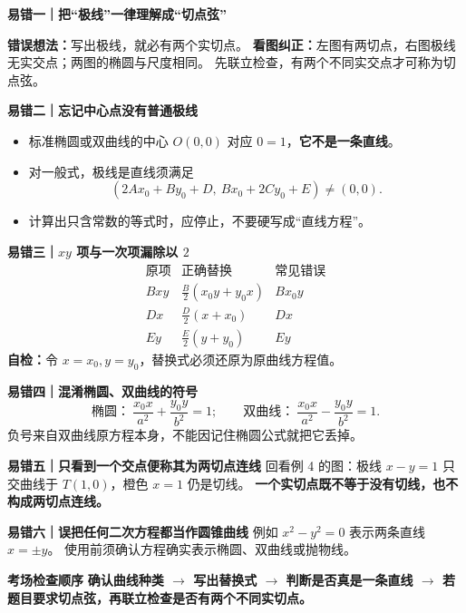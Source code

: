 \begin{trapbox}
\begin{minipage}{\linewidth}
\textbf{\textcolor{CTrap}{易错一｜把“极线”一律理解成“切点弦”}}

\begin{center}

\end{center}

\textbf{错误想法：}写出极线，就必有两个实切点。
\textbf{看图纠正：}左图有两切点，右图极线无实交点；两图的椭圆与尺度相同。
先联立检查，有两个不同实交点才可称为切点弦。
\end{minipage}
\par


\medskip
\textbf{\textcolor{CTrap}{易错二｜忘记中心点没有普通极线}}
\begin{itemize}[leftmargin=*,itemsep=0.35em]
 \item 标准椭圆或双曲线的中心 $O(0,0)$ 对应 $0=1$，\textbf{它不是一条直线}。
 \item 对一般式，极线是直线须满足
 \[
 (2Ax_0+By_0+D,\ Bx_0+2Cy_0+E)\ne(0,0).
 \]
 \item 计算出只含常数的等式时，应停止，不要硬写成“直线方程”。
\end{itemize}

\medskip
\textbf{\textcolor{CTrap}{易错三｜$xy$ 项与一次项漏除以 $2$}}
\[
 \begin{array}{c|c|c}
 \text{原项}&\text{正确替换}&\text{常见错误}\\
 Bxy &\frac B2(x_0y+y_0x)&Bx_0y\\
 Dx &\frac D2(x+x_0)&Dx\\
 Ey &\frac E2(y+y_0)&Ey
 \end{array}
\]
\textbf{自检：}令 $x=x_0,y=y_0$，替换式必须还原为原曲线方程值。

\medskip
\textbf{\textcolor{CTrap}{易错四｜混淆椭圆、双曲线的符号}}
\[
 \text{椭圆：}\ \frac{x_0x}{a^2}+\frac{y_0y}{b^2}=1;
 \qquad
 \text{双曲线：}\ \frac{x_0x}{a^2}-\frac{y_0y}{b^2}=1.
\]
负号来自双曲线原方程本身，不能因记住椭圆公式就把它丢掉。

\medskip
\textbf{\textcolor{CTrap}{易错五｜只看到一个交点便称其为两切点连线}}
回看例 4 的图：极线 $x-y=1$ 只交曲线于 $T(1,0)$，橙色 $x=1$ 仍是切线。
\textbf{一个实切点既不等于没有切线，也不构成两切点连线。}

\medskip
\textbf{\textcolor{CTrap}{易错六｜误把任何二次方程都当作圆锥曲线}}
例如 $x^2-y^2=0$ 表示两条直线 $x=\pm y$。
使用前须确认方程确实表示椭圆、双曲线或抛物线。

\medskip
\textbf{\textcolor{CTrap}{考场检查顺序}}
\textbf{确认曲线种类 $\to$ 写出替换式 $\to$ 判断是否真是一条直线 $\to$
若题目要求切点弦，再联立检查是否有两个不同实切点。}
\end{trapbox}
